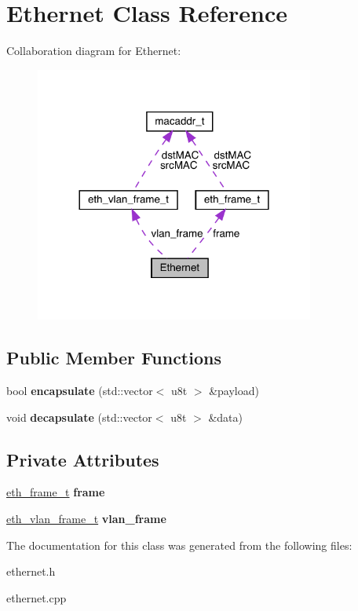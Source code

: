 \hypertarget{classEthernet}{}\section{Ethernet Class Reference}
\label{classEthernet}


Collaboration diagram for Ethernet\+:\nopagebreak
\begin{figure}[H]
\begin{center}
\leavevmode
\includegraphics[width=260pt]{classEthernet__coll__graph}
\end{center}
\end{figure}
\subsection*{Public Member Functions}
\begin{DoxyCompactItemize}
\item 
\mbox{\label{classEthernet_a0ee0a7b0720489214113bde0fb14fd12}} 
bool {\bfseries encapsulate} (std\+::vector$<$ u8t $>$ \&payload)
\item 
\mbox{\label{classEthernet_a6a3304c3cd5c3b79049d24fcc2854f48}} 
void {\bfseries decapsulate} (std\+::vector$<$ u8t $>$ \&data)
\end{DoxyCompactItemize}
\subsection*{Private Attributes}
\begin{DoxyCompactItemize}
\item 
\mbox{\label{classEthernet_a9d4e1ec352eb5209d5675592aebfdd85}} 
\mbox{\hyperlink{structeth__frame__t}{eth\+\_\+frame\+\_\+t}} {\bfseries frame}
\item 
\mbox{\label{classEthernet_ad6f419f6b4c1050af2d4b974186d862e}} 
\mbox{\hyperlink{structeth__vlan__frame__t}{eth\+\_\+vlan\+\_\+frame\+\_\+t}} {\bfseries vlan\+\_\+frame}
\end{DoxyCompactItemize}


The documentation for this class was generated from the following files\+:\begin{DoxyCompactItemize}
\item 
ethernet.\+h\item 
ethernet.\+cpp\end{DoxyCompactItemize}
